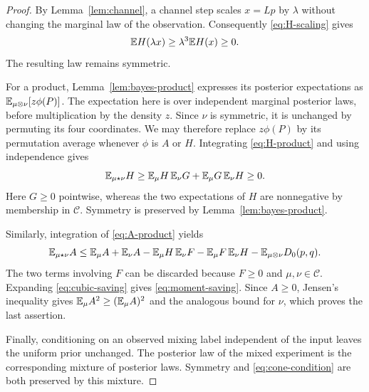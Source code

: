 \begin{proof}
By Lemma~\ref{lem:channel}, a channel step scales $x=Lp$ by $\lambda$
without changing the marginal law of the observation. Consequently
\eqref{eq:H-scaling} gives
\[
 \mathbb E H(\lambda x)\geq\lambda^3\mathbb E H(x)\geq0.
\]
The resulting law remains symmetric.

For a product, Lemma~\ref{lem:bayes-product} expresses its posterior
expectations as $\mathbb E_{\mu\otimes\nu}[z\phi(P)]$. The expectation here is
over independent marginal posterior laws, before multiplication by the
density $z$. Since $\nu$ is symmetric, it is unchanged by permuting its
four coordinates. We may therefore replace $z\phi(P)$ by its permutation
average whenever $\phi$ is $A$ or $H$. Integrating
\eqref{eq:H-product} and using independence gives
\[
 \mathbb E_{\mu\star\nu}H
 \geq \mathbb E_{\mu}H\,\mathbb E_{\nu}G+
        \mathbb E_{\mu}G\,\mathbb E_{\nu}H\geq0.
\]
Here $G\geq0$ pointwise, whereas the two expectations of $H$ are
nonnegative by membership in $\mathcal C$. Symmetry is preserved by
Lemma~\ref{lem:bayes-product}.

Similarly, integration of \eqref{eq:A-product} yields
\[
 \mathbb E_{\mu\star\nu}A
 \leq \mathbb E_{\mu}A+\mathbb E_{\nu}A
       -\mathbb E_{\mu}H\,\mathbb E_{\nu}F
       -\mathbb E_{\mu}F\,\mathbb E_{\nu}H
       -\mathbb E_{\mu\otimes\nu}D_0(p,q).
\]
The two terms involving $F$ can be discarded because $F\geq0$ and
$\mu,\nu\in\mathcal C$. Expanding \eqref{eq:cubic-saving} gives
\eqref{eq:moment-saving}. Since $A\geq0$, Jensen's inequality gives
$\mathbb E_{\mu}A^2\geq(\mathbb E_{\mu}A)^2$ and the analogous bound for $\nu$,
which proves the last assertion.

Finally, conditioning on an observed mixing label independent of the input
leaves the uniform prior unchanged. The posterior law of the mixed
experiment is the corresponding mixture of posterior laws. Symmetry and
\eqref{eq:cone-condition} are both preserved by this mixture.
\end{proof}
